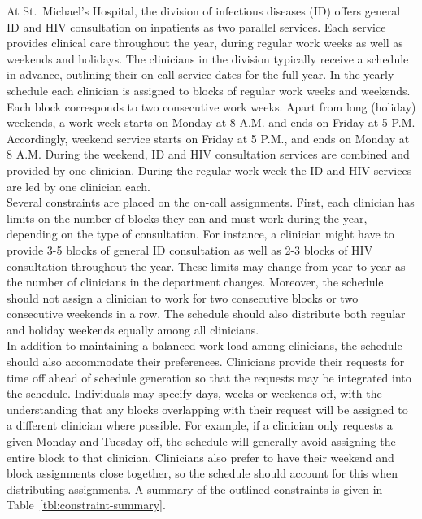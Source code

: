 At St.\ Michael's Hospital, the division of infectious diseases (ID) offers
general ID and HIV consultation on inpatients as two parallel services. Each
service provides clinical care throughout the year, during regular work weeks as
well as weekends and holidays. The clinicians in the division typically receive
a schedule in advance, outlining their on-call service dates for the full year.
In the yearly schedule each clinician is assigned to blocks of regular work
weeks and weekends. Each block corresponds to two consecutive work weeks. Apart
from long (holiday) weekends, a work week starts on Monday at 8 A.M. and ends on
Friday at 5 P.M. Accordingly, weekend service starts on Friday at 5 P.M., and
ends on Monday at 8 A.M. During the weekend, ID and HIV consultation services
are combined and provided by one clinician. During the regular work week the ID
and HIV services are led by one clinician each. \\

Several constraints are placed on the on-call assignments. First, each clinician
has limits on the number of blocks they can and must work during the year,
depending on the type of consultation. For instance, a clinician might have to
provide 3-5 blocks of general ID consultation as well as 2-3 blocks of HIV
consultation throughout the year. These limits may change from year to year as
the number of clinicians in the department changes. Moreover, the schedule
should not assign a clinician to work for two consecutive blocks or two
consecutive weekends in a row. The schedule should also distribute both regular
and holiday weekends equally among all clinicians. \\

In addition to maintaining a balanced work load among clinicians, the schedule
should also accommodate their preferences. Clinicians provide their requests for
time off ahead of schedule generation so that the requests may be integrated
into the schedule. Individuals may specify days, weeks or weekends off, with the
understanding that any blocks overlapping with their request will be assigned to
a different clinician where possible. For example, if a clinician only requests
a given Monday and Tuesday off, the schedule will generally avoid assigning the
entire block to that clinician. Clinicians also prefer to have their weekend and
block assignments close together, so the schedule should account for this when
distributing assignments. A summary of the outlined constraints is given in
Table~\ref{tbl:constraint-summary}.


